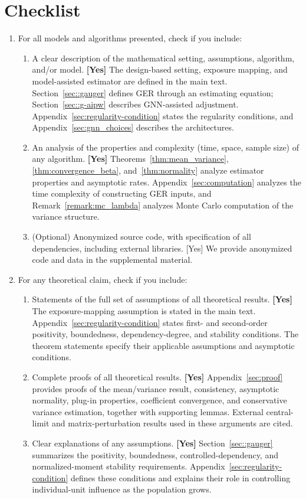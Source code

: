 \section*{Checklist}


\begin{enumerate}

  \item For all models and algorithms presented, check if you include:
  \begin{enumerate}
    \item A clear description of the mathematical setting, assumptions, algorithm, and/or model. \textbf{[Yes]} The design-based setting, exposure mapping, and model-assisted estimator are defined in the main text. Section~\ref{sec::gauger} defines GER through an estimating equation; Section~\ref{sec::g-aipw} describes GNN-assisted adjustment. Appendix~\ref{sec:regularity-condition} states the regularity conditions, and Appendix~\ref{sec:gnn_choices} describes the architectures.
    \item An analysis of the properties and complexity (time, space, sample size) of any algorithm. \textbf{[Yes]} Theorems~\ref{thm:mean_variance}, \ref{thm:convergence_beta}, and~\ref{thm:normality} analyze estimator properties and asymptotic rates. Appendix~\ref{sec:computation} analyzes the time complexity of constructing GER inputs, and Remark~\ref{remark:mc_lambda} analyzes Monte Carlo computation of the variance structure.
    \item (Optional) Anonymized source code, with specification of all dependencies, including external libraries. [Yes] We provide anonymized code and data in the supplemental material. 
  \end{enumerate}

  \item For any theoretical claim, check if you include:
  \begin{enumerate}
    \item Statements of the full set of assumptions of all theoretical results. \textbf{[Yes]} The exposure-mapping assumption is stated in the main text. Appendix~\ref{sec:regularity-condition} states first- and second-order positivity, boundedness, dependency-degree, and stability conditions. The theorem statements specify their applicable assumptions and asymptotic conditions.
    \item Complete proofs of all theoretical results. \textbf{[Yes]} Appendix~\ref{sec:proof} provides proofs of the mean/variance result, consistency, asymptotic normality, plug-in properties, coefficient convergence, and conservative variance estimation, together with supporting lemmas. External central-limit and matrix-perturbation results used in these arguments are cited.
    \item Clear explanations of any assumptions. \textbf{[Yes]} Section~\ref{sec::gauger} summarizes the positivity, boundedness, controlled-dependency, and normalized-moment stability requirements. Appendix~\ref{sec:regularity-condition} defines these conditions and explains their role in controlling individual-unit influence as the population grows.
  \end{enumerate}


\end{enumerate}
